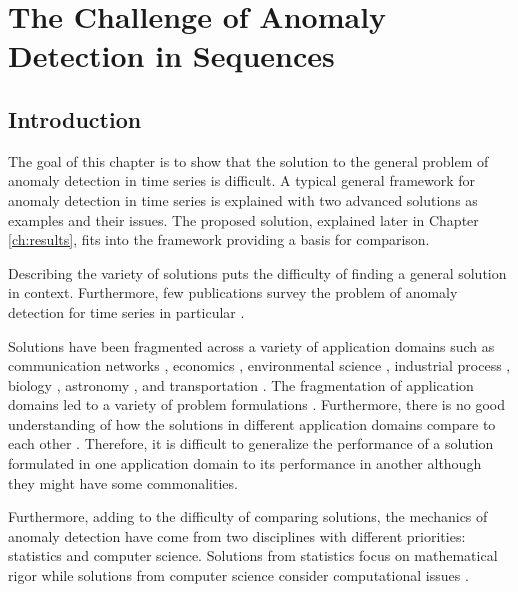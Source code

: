 \chapter{The Challenge of Anomaly Detection in Sequences}
\label{ch:ad}

\section{Introduction}

The goal of this chapter is to show that the solution to the general problem of anomaly detection in time series is difficult. A typical general framework for anomaly detection in time series is explained with two advanced solutions as examples and their issues. The proposed solution, explained later in Chapter \ref{ch:results}, fits into the framework providing a basis for comparison.

Describing the variety of solutions puts the difficulty of finding a general solution in context. Furthermore, few publications survey the problem of anomaly detection for time series in particular \cite{Cheboli2010,Gupta2013}.

Solutions have been fragmented across a variety of application domains such as communication networks \cite{Jiang2006, Szymanski2004, Ye2000, Portnoy2001, Zhen2006, Warrender1999, Angiulli2007, Lane1999, Lane1997, Hofmeyr1998, Sequeira2002}, economics \cite{gupta2012community, Otey2006, Zhu2003}, environmental science \cite{Hill2010, Hill2010a, Angiulli2007, Birant2006, Cheng2006, Yuxiang2005, Wu2010, Drosdowsky1993, Lasaponara2006, Lu2004}, industrial process \cite{Basu2007, Nairac1999, Dasgupta1996, Bu2007}, biology \cite{Keogh2005, Wei2006}, astronomy \cite{Keogh2005, Yankov2008}, and transportation \cite{Li2009,Ge2010}. The fragmentation of application domains led to a variety of problem formulations \cite{Gupta2013}. Furthermore, there is no good understanding of how the solutions in different application domains compare to each other \cite{Cheboli2010}. Therefore, it is difficult to generalize the performance of a solution formulated in one application domain to its performance in another although they might have some commonalities.

Furthermore, adding to the difficulty of comparing solutions, the mechanics of anomaly detection have come from two disciplines with different priorities: statistics and computer science. Solutions from statistics focus on mathematical rigor while solutions from computer science consider computational issues \cite{Gupta2013}.


